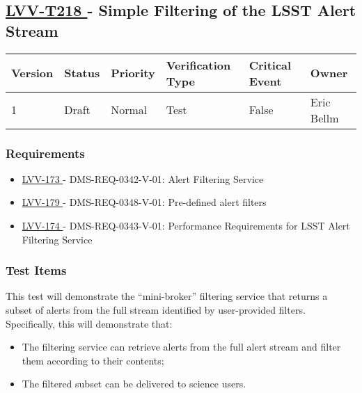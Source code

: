 \subsection{ \href{https://jira.lsstcorp.org/secure/Tests.jspa\#/testCase/LVV-T218}{ LVV-T218 }
             - Simple Filtering of the LSST Alert Stream }\label{lvv-t218}





\begin{longtable}[]{llllll}
\toprule
Version & Status & Priority & Verification Type & Critical Event & Owner
\\\midrule
1 & Draft & Normal & Test & False & Eric Bellm
\\\bottomrule
\end{longtable}

\subsubsection{Requirements}

\begin{itemize}

\item \href{https://jira.lsstcorp.org/browse/LVV-173}{ LVV-173 } - DMS-REQ-0342-V-01: Alert Filtering Service

\item \href{https://jira.lsstcorp.org/browse/LVV-179}{ LVV-179 } - DMS-REQ-0348-V-01: Pre-defined alert filters

\item \href{https://jira.lsstcorp.org/browse/LVV-174}{ LVV-174 } - DMS-REQ-0343-V-01: Performance Requirements for LSST Alert Filtering Service

\end{itemize}


\subsubsection{Test Items}

This test will demonstrate the ``mini-broker'' filtering service that
returns a subset of alerts from the full stream identified by
user-provided filters.\\[2\baselineskip]Specifically, this will
demonstrate that:\\

\begin{itemize}
\tightlist
\item
  The filtering service can retrieve alerts from the full alert stream
  and filter them according to their contents; ~ ~
\item
  The filtered subset can be delivered to science users.
\end{itemize}





